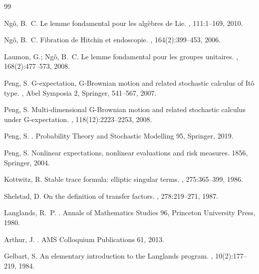 \documentclass[11pt,a4paper]{article}
\theoremstyle{definition}
\begin{document}

\begin{thebibliography}{99}

Ng\^o, B.~C.
\newblock Le lemme fondamental pour les alg\`ebres de Lie.
, 111:1--169, 2010.

Ng\^o, B.~C.
\newblock Fibration de Hitchin et endoscopie.
, 164(2):399--453, 2006.

Laumon, G.; Ng\^o, B.~C.
\newblock Le lemme fondamental pour les groupes unitaires.
, 168(2):477--573, 2008.

Peng, S.
\newblock G-expectation, G-Brownian motion and related stochastic calculus of It\^o type.
, Abel Symposia 2, Springer, 541--567, 2007.

Peng, S.
\newblock Multi-dimensional G-Brownian motion and related stochastic calculus under G-expectation.
, 118(12):2223--2253, 2008.

Peng, S.
.
\newblock Probability Theory and Stochastic Modelling 95, Springer, 2019.

Peng, S.
\newblock Nonlinear expectations, nonlinear evaluations and risk measures.
 1856, Springer, 2004.

Kottwitz, R.
\newblock Stable trace formula: elliptic singular terms.
, 275:365--399, 1986.

Shelstad, D.
\newblock On the definition of transfer factors.
, 278:219--271, 1987.

Langlands, R.~P.
.
\newblock Annals of Mathematics Studies 96, Princeton University Press, 1980.

Arthur, J.
.
\newblock AMS Colloquium Publications 61, 2013.

Gelbart, S.
\newblock An elementary introduction to the Langlands program.
, 10(2):177--219, 1984.


\end{thebibliography}
\end{document}
